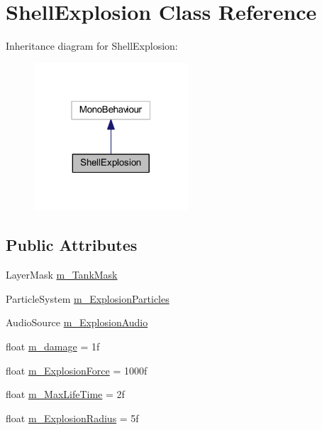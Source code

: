 \hypertarget{class_shell_explosion}{}\section{Shell\+Explosion Class Reference}
\label{class_shell_explosion}


Inheritance diagram for Shell\+Explosion\+:
\nopagebreak
\begin{figure}[H]
\begin{center}
\leavevmode
\includegraphics[width=163pt]{class_shell_explosion__inherit__graph}
\end{center}
\end{figure}
\subsection*{Public Attributes}
\begin{DoxyCompactItemize}
\item 
Layer\+Mask \hyperlink{class_shell_explosion_a7836a8802592e5b16960749293b7e8a1}{m\+\_\+\+Tank\+Mask}
\item 
Particle\+System \hyperlink{class_shell_explosion_adfe43cddc71e351e3a44cc6a0e626de4}{m\+\_\+\+Explosion\+Particles}
\item 
Audio\+Source \hyperlink{class_shell_explosion_a71d680ca98a5c785614d96677dcc1017}{m\+\_\+\+Explosion\+Audio}
\item 
float \hyperlink{class_shell_explosion_aa630b14bfc32cd63e6c73def71aaeea5}{m\+\_\+damage} = 1f
\item 
float \hyperlink{class_shell_explosion_aedf8145b8210b8be0bd077eab2adb184}{m\+\_\+\+Explosion\+Force} = 1000f
\item 
float \hyperlink{class_shell_explosion_a6a3f3ce0baaa7342c0a455f0d85a5cae}{m\+\_\+\+Max\+Life\+Time} = 2f
\item 
float \hyperlink{class_shell_explosion_a17648fa0f429b6dab061971065fe0344}{m\+\_\+\+Explosion\+Radius} = 5f
\end{DoxyCompactItemize}



